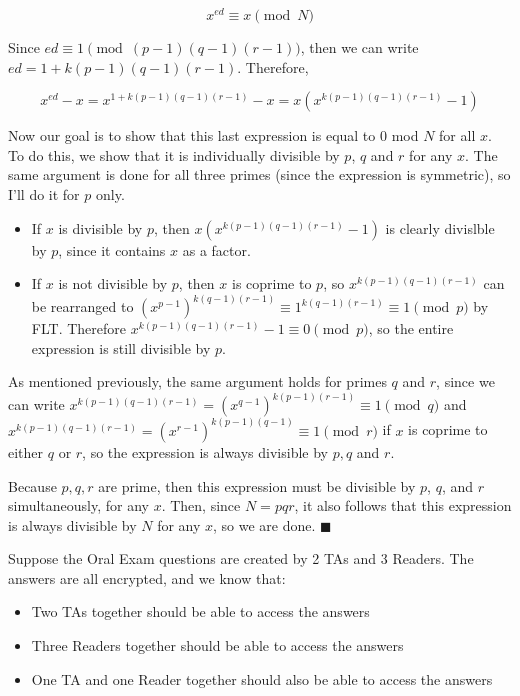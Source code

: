 \documentclass[11pt]{article}
\begin{document}
\begin{Parts}
\begin{solution}
        \[ x^{ed} \equiv x \pmod{N}\]

        Since $ed \equiv 1 \pmod{(p - 1)(q - 1)(r - 1)}$, then we can write $ed = 1 + k(p - 1)(q - 1)(r - 1)$. Therefore, 

        \[ x^{ed} - x= x^{1 + k(p - 1)(q - 1)(r - 1)} - x = x\left(x^{k(p - 1)(q - 1)(r - 1)} - 1\right)\]

        Now our goal is to show that this last expression is equal to 0 mod $N$ for all $x$. To do this, we show that it is individually divisible by $p$, $q$ and $r$ for any $x$. The same argument is done for all three primes (since the expression is symmetric), so I'll do it for $p$ only. 

        \begin{itemize}
            \item If $x$ is divisible by $p$, then $x(x^{k(p - 1)(q - 1)(r - 1)} - 1)$ is clearly divislble by $p$, since it contains $x$ as a factor.
            \item If $x$ is not divisible by $p$, then $x$ is coprime to $p$, so $x^{k(p - 1)(q - 1)(r - 1)}$ can be rearranged to $\left(x^{p - 1}\right)^{k(q - 1)(r - 1)} \equiv 1^{k(q - 1)(r - 1)} \equiv 1 \pmod{p}$ by FLT. Therefore $x^{k(p - 1)(q - 1)(r - 1)} - 1 \equiv 0 \pmod p$, so the entire expression is still divisible by $p$.
        \end{itemize}

        As mentioned previously, the same argument holds for primes $q$ and $r$, since we can write $x^{k(p - 1)(q - 1)(r - 1)} = \left(x^{q - 1}\right)^{k(p - 1)(r - 1)} \equiv 1 \pmod{q}$ and $x^{k(p - 1)(q - 1)(r - 1)} = \left(x^{r - 1}\right)^{k(p - 1)(q - 1)} \equiv 1 \pmod{r}$ if $x$ is coprime to either $q$ or $r$, so the expression is always divisible by $p,q$ and $r$. 
        
        Because $p, q, r$ are prime, then this expression must be divisible by $p$, $q$, and $r$ simultaneously, for any $x$. Then, since $N = pqr$, it also follows that this expression is always divisible by $N$ for any $x$, so we are done. $\blacksquare$
    \end{solution}

\end{Parts}
\pagebreak
{}

Suppose the Oral Exam questions are created by 2 TAs and 3 Readers. The answers are all encrypted, and we know that:

\begin{itemize}
\item Two TAs together should be able to access the answers
\item Three Readers together should be able to access the answers
\item One TA and one Reader together should also be able to access the answers
\end{itemize}
\end{document}
